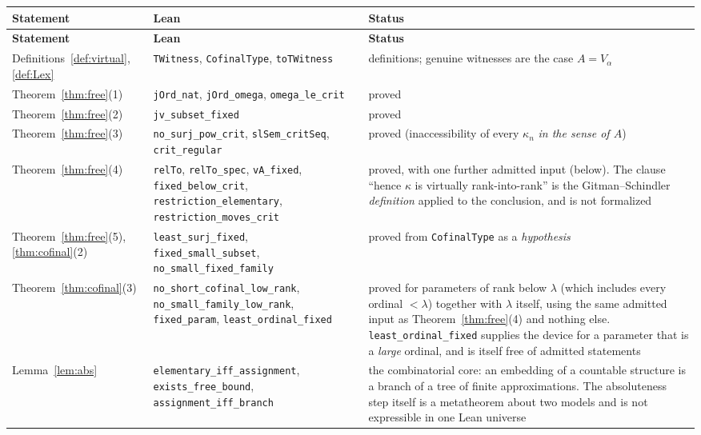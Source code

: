 \documentclass[11pt,letterpaper]{article}
\theoremstyle{definition}
\numberwithin{equation}{section}
\begin{document}
\begingroup\small
\renewcommand{\arraystretch}{1.2}
\begin{longtable}{@{}P{.24\textwidth}P{.34\textwidth}P{.34\textwidth}@{}}
\toprule
\textbf{Statement}&\textbf{Lean}&\textbf{Status}\\\midrule\endfirsthead
\toprule
\textbf{Statement}&\textbf{Lean}&\textbf{Status}\\\midrule\endhead
Definitions~\ref{def:virtual}, \ref{def:Lex}&\nolinkurl{TWitness}, \nolinkurl{CofinalType}, \nolinkurl{toTWitness}&definitions; genuine witnesses are the case $A=V_\alpha$\\
Theorem~\ref{thm:free}(1)&\nolinkurl{jOrd_nat}, \nolinkurl{jOrd_omega}, \nolinkurl{omega_le_crit}&proved\\
Theorem~\ref{thm:free}(2)&\nolinkurl{jv_subset_fixed}&proved\\
Theorem~\ref{thm:free}(3)&\nolinkurl{no_surj_pow_crit}, \nolinkurl{slSem_critSeq}, \nolinkurl{crit_regular}&proved (inaccessibility of every $\kappa_n$ \emph{in the sense of $A$})\\
Theorem~\ref{thm:free}(4)&\nolinkurl{relTo}, \nolinkurl{relTo_spec}, \nolinkurl{vA_fixed}, \nolinkurl{fixed_below_crit}, \nolinkurl{restriction_elementary}, \nolinkurl{restriction_moves_crit}&proved, with one further admitted input (below). The clause ``hence $\kappa$ is virtually rank-into-rank'' is the Gitman--Schindler \emph{definition} applied to the conclusion, and is not formalized\\
Theorem~\ref{thm:free}(5), \ref{thm:cofinal}(2)&\nolinkurl{least_surj_fixed}, \nolinkurl{fixed_small_subset}, \nolinkurl{no_small_fixed_family}&proved from \nolinkurl{CofinalType} as a \emph{hypothesis}\\
Theorem~\ref{thm:cofinal}(3)&\nolinkurl{no_short_cofinal_low_rank}, \nolinkurl{no_small_family_low_rank}, \nolinkurl{fixed_param}, \nolinkurl{least_ordinal_fixed}&proved for parameters of rank below $\lambda$ (which includes every ordinal $<\lambda$) together with $\lambda$ itself, using the same admitted input as Theorem~\ref{thm:free}(4) and nothing else. \nolinkurl{least_ordinal_fixed} supplies the device for a parameter that is a \emph{large} ordinal, and is itself free of admitted statements\\
Lemma~\ref{lem:abs}&\nolinkurl{elementary_iff_assignment}, \nolinkurl{exists_free_bound}, \nolinkurl{assignment_iff_branch}&the combinatorial core: an embedding of a countable structure is a branch of a tree of finite approximations. The absoluteness step itself is a metatheorem about two models and is not expressible in one Lean universe\\

\end{longtable}
\end{document}
